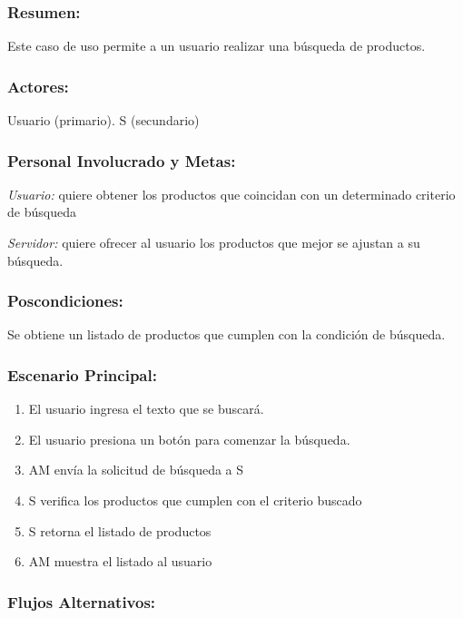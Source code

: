 \begin{framed}


\subsubsection{Resumen:} Este caso de uso permite a un usuario realizar una búsqueda de productos.


\subsubsection{Actores:} Usuario (primario). S (secundario)

\subsubsection{Personal Involucrado y Metas:}

\emph{Usuario:} quiere obtener los productos que coincidan con un determinado criterio de búsqueda

\emph{Servidor:} quiere ofrecer al usuario los productos que mejor se ajustan a su búsqueda.

\subsubsection{Poscondiciones:} 
Se obtiene un listado de productos que cumplen con la condición de búsqueda.

\subsubsection{Escenario Principal: }

\begin{enumerate}
    \item El usuario ingresa el texto que se buscará.  
    \item El usuario presiona un botón para comenzar la búsqueda.
    \item AM envía la solicitud de búsqueda a S
    \item S verifica los productos que cumplen con el criterio buscado
    \item S retorna el listado de productos
    \item AM muestra el listado al usuario
\end{enumerate}

\subsubsection{Flujos Alternativos: }


\end{framed}
